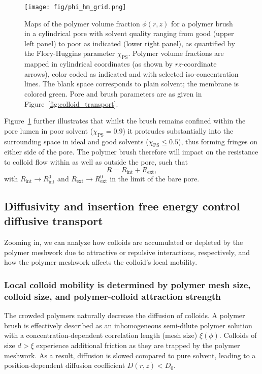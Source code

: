 \documentclass[12pt, a4paper]{article}
\begin{document}
\begin{figure}
    \centering
    \texttt{[image: fig/phi\_hm\_grid.png]}
    \caption{
    Maps of the polymer volume fraction $\phi(r,z)$ for a polymer brush in a cylindrical pore with solvent quality ranging from good (upper left panel) to poor as indicated (lower right panel), as quantified by the Flory-Huggins parameter $\chi_{\text{PS}}$.
    Polymer volume fractions are mapped in cylindrical coordinates (as shown by $rz$-coordinate arrows), color coded as indicated and with selected iso-concentration lines. The blank space corresponds to plain solvent; the membrane is colored green.
    Pore and brush parameters are as given in Figure~\ref{fig:colloid_transport}.
    }
    \label{fig:phi_hm_grid}
\end{figure}

Figure~\ref{fig:phi_hm_grid} further illustrates that whilst the brush remains confined within the pore lumen in poor solvent ($\chi_{\text{PS}}=0.9$) it protrudes substantially into the surrounding space in ideal and good solvents ($\chi_{\text{PS}}\le0.5$), thus forming fringes on either side of the pore.
The polymer brush therefore will impact on the resistance to colloid flow within as well as outside the pore, such that
\begin{equation}
    R=R_{\text{int}}+R_{\text{ext}},
    \label{eq:R_tot_tot}
\end{equation}
with $R_{\text{int}}\rightarrow R_{\text{int}}^{0}$ and $R_{\text{ext}}\rightarrow R_{\text{ext}}^{0}$ in the limit of the bare pore.


\subsection{Diffusivity and insertion free energy control diffusive transport}

Zooming in, we can analyze how colloids are accumulated or depleted by the polymer meshwork due to attractive or repulsive interactions, respectively, and how the polymer meshwork affects the colloid's local mobility.

\subsubsection{Local colloid mobility is determined by polymer mesh size, colloid size, and polymer-colloid attraction strength}

The crowded polymers naturally decrease the diffusion of colloids.
A polymer brush is effectively described as an inhomogeneous semi-dilute polymer solution with a concentration-dependent correlation length (mesh size) $\xi(\phi)$.
Colloids of size $d > \xi$ experience additional friction as they are trapped by the polymer meshwork.
As a result, diffusion is slowed compared to pure solvent, leading to a position-dependent diffusion coefficient $D(r,z) < D_0$.
\end{document}
